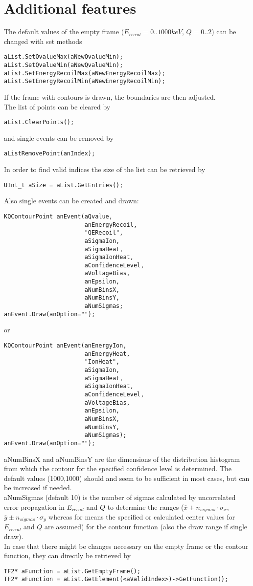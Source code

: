 \documentclass[10pt, a4paper]{article}
\begin{document}
\section{Additional features}

The default values of the empty frame ($E_{recoil} = 0..1000 keV$, $Q = 0..2$) can be changed with set methods
\begin{verbatim}
aList.SetQvalueMax(aNewQvalueMin);
aList.SetQvalueMin(aNewQvalueMin);
aList.SetEnergyRecoilMax(aNewEnergyRecoilMax);
aList.SetEnergyRecoilMin(aNewEnergyRecoilMin);
\end{verbatim}
If the frame with contours is drawn, the boundaries are then adjusted. \\

The list of points can be cleared by
\begin{verbatim}
aList.ClearPoints();
\end{verbatim}
and single events can be removed by
\begin{verbatim}
aListRemovePoint(anIndex);
\end{verbatim}
In order to find valid indices the size of the list can be retrieved by
\begin{verbatim}
UInt_t aSize = aList.GetEntries();
\end{verbatim}

Also single events can be created and drawn:
\begin{verbatim}
KQContourPoint anEvent(aQvalue,
                       anEnergyRecoil,
                       "QERecoil",
                       aSigmaIon,
                       aSigmaHeat,
                       aSigmaIonHeat,
                       aConfidenceLevel,
                       aVoltageBias,
                       anEpsilon,
                       aNumBinsX,
                       aNumBinsY,
                       aNumSigmas;
anEvent.Draw(anOption="");
\end{verbatim}
or
\begin{verbatim}
KQContourPoint anEvent(anEnergyIon,
                       anEnergyHeat,
                       "IonHeat",
                       aSigmaIon,
                       aSigmaHeat,
                       aSigmaIonHeat,
                       aConfidenceLevel,
                       aVoltageBias,
                       anEpsilon,
                       aNumBinsX,
                       aNumBinsY,
                       aNumSigmas);
anEvent.Draw(anOption="");
\end{verbatim}
aNumBinsX and aNumBinsY are the dimensions of the distribution histogram from which the contour for the specified confidence level is determined.
The default values (1000,1000) should and seem to be sufficient in most cases, but can be increased if needed. \\
aNumSigmas (default 10) is the number of sigmas calculated by uncorrelated error propagation in $E_{recoil}$ and $Q$ to determine the ranges ($\overline{x} \pm n_{sigmas} \cdot \sigma_{x}$,$\overline{y} \pm n_{sigmas} \cdot \sigma_{y}$  whereas for means the specified or calculated center values for $E_{recoil}$ and $Q$ are assumed)  for the contour function (also the draw range if single draw). \\[0.5cm]

In case that there might be changes necessary on the empty frame or the contour function, they can directly be retrieved by
\begin{verbatim}
TF2* aFunction = aList.GetEmptyFrame();
TF2* aFunction = aList.GetElement(<aValidIndex>)->GetFunction();
\end{verbatim}
\end{document}
